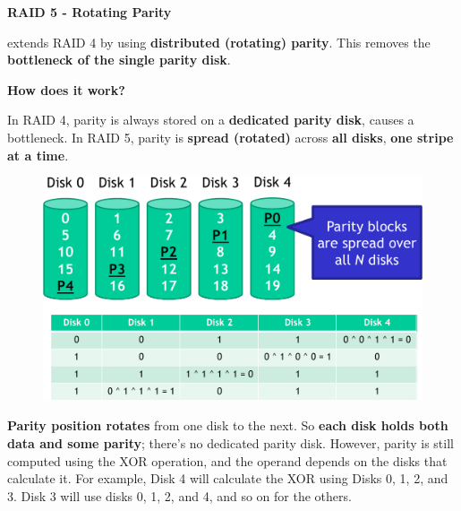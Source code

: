 \newpage

\begin{center}\label{RAID 5}
    \large
    \hypertarget{RAID 5}{\textcolor{Red2}{\textbf{RAID 5 - Rotating Parity}}}
\end{center}

\noindent
{} extends RAID 4 by using \textbf{distributed (rotating) parity}. This removes the \textbf{bottleneck of the single parity disk}.

\highspace
\begin{flushleft}
    \textcolor{Green3}{ \textbf{How does it work?}}
\end{flushleft}
In RAID 4, parity is always stored on a \textbf{dedicated parity disk}, causes a bottleneck. In RAID 5, parity is \textbf{spread (rotated)} across \textbf{all disks}, \textbf{one stripe at a time}.

\begin{figure}[!htp]
    \centering
    \includegraphics[width=\textwidth]{img/raid-9.pdf}
\end{figure}

\noindent
\textbf{Parity position rotates} from one disk to the next. So \textbf{each disk holds both data and some parity}; there's no dedicated parity disk. However, parity is still computed using the XOR operation, and the operand depends on the disks that calculate it. For example, Disk 4 will calculate the XOR using Disks 0, 1, 2, and 3. Disk 3 will use disks 0, 1, 2, and 4, and so on for the others.

